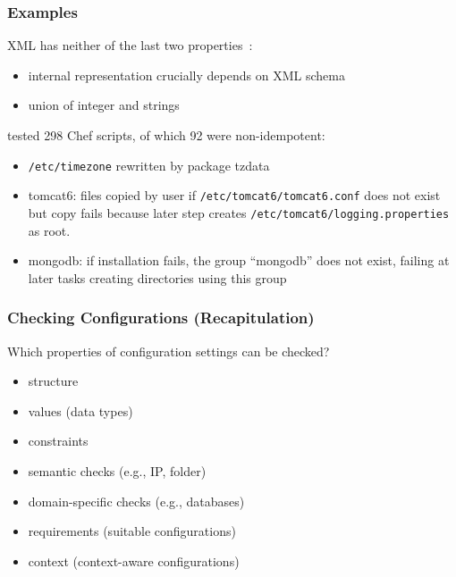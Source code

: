 \begin{frame}
	\frametitle{Examples}

	XML has neither of the last two properties~\citet{wadler2003xml}:

	\begin{itemize}[<+-| alert@+>]
	\item internal representation crucially depends on XML schema
	\item union of integer and strings
	\end{itemize}

	\pause[\thebeamerpauses]  %

	\citet{waldemar2013testing} tested 298 Chef scripts, of which 92 were non-idempotent:

	\begin{itemize}[<+-| alert@+>]
	\item \texttt{/etc/timezone} rewritten by package tzdata
	\item tomcat6: files copied by user if \texttt{/etc/tomcat6/tomcat6.conf} does not exist but copy fails because later step creates \texttt{/etc/tomcat6/logging.properties} as root.
	\item mongodb: if installation fails, the group ``mongodb'' does not exist, failing at later tasks creating directories using this group
	\end{itemize}
\end{frame}

\begin{frame}
	\frametitle{Checking Configurations (Recapitulation)}

	\begin{task}
	Which properties of configuration settings can be checked?
	\end{task}

	\pause

	\begin{itemize} %
	\item structure
	\item values (data types)
	\item constraints
	\item semantic checks (e.g., IP, folder)
	\item domain-specific checks (e.g., databases)
	\item requirements (suitable configurations)
	\item context (context-aware configurations)
	\end{itemize}
\end{frame}

